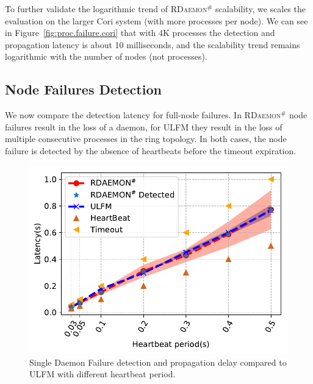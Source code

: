 \documentclass[5p,times,twocolumn]{elsarticle}
\newcommand{\ulfm}[0]{\textsc{ULFM}\xspace}
\newcommand{\ourwork}[0]{\textsc{RDaemon}\ensuremath{^\#}\xspace}
\begin{document}
To further validate the logarithmic trend of \ourwork scalability, we scales the evaluation on the larger Cori system (with more processes per node). We can see in Figure~\ref{fig:proc.failure.cori} that with 4K processes the detection and propagation latency is about 10 milliseconds, and the scalability trend remains logarithmic with the number of nodes (not processes).

\subsection{Node Failures Detection}
We now compare the detection latency for full-node failures. In \ourwork
node failures result in the loss of a daemon, for \ulfm they result in
the loss of multiple consecutive processes in the ring topology. In
both cases, the node failure is detected by the absence of heartbeats
before the timeout expiration.

\begin{figure}[h]
  \centering
  \includegraphics[width=\linewidth]{PRRTE_ULFM_comparision.pdf}\vspace{-1em}
  \caption{Single Daemon Failure detection and propagation delay compared to \ulfm with different heartbeat period.}
  \label{fig:node.failure.hb}
\end{figure}
\end{document}
